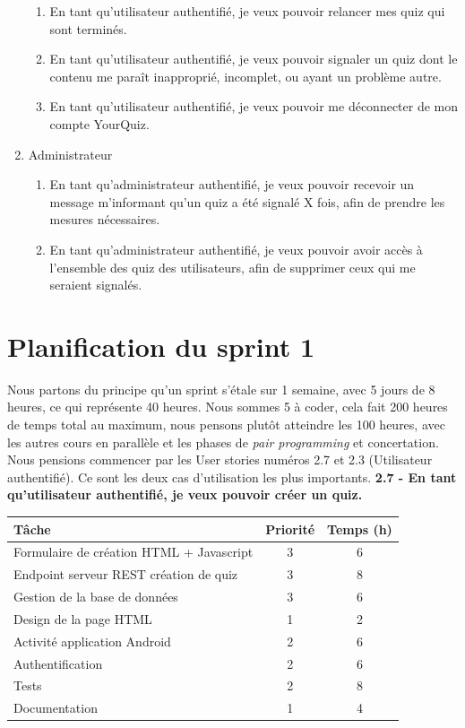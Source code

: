 \documentclass[a4paper, 12pt]{article}
\begin{document}
\begin{enumerate}
\begin{enumerate}
        \item En tant qu'utilisateur authentifié, je veux pouvoir relancer mes quiz qui sont terminés.
        \item En tant qu'utilisateur authentifié, je veux pouvoir signaler un quiz dont le contenu me paraît inapproprié, incomplet, ou ayant un problème autre.
        \item En tant qu'utilisateur authentifié, je veux pouvoir me déconnecter de mon compte YourQuiz.
    \end{enumerate}
    \item Administrateur
    \begin{enumerate}
        \item En tant qu'administrateur authentifié, je veux pouvoir recevoir un message m'informant qu'un quiz a été signalé X fois, afin de prendre les mesures nécessaires.
        \item En tant qu'administrateur authentifié, je veux pouvoir avoir accès à l'ensemble des quiz des utilisateurs, afin de supprimer ceux qui me seraient signalés.
    \end{enumerate}
\end{enumerate}


\section{Planification du sprint 1}
Nous partons du principe qu'un sprint s'étale sur 1 semaine, avec 5 jours de 8 heures, ce qui représente 
40 heures. Nous sommes 5 à coder, cela fait 200 heures de temps total au maximum, nous pensons plutôt atteindre les 100 heures, 
avec les autres cours en parallèle et les phases de \textit{pair programming} et concertation. Nous pensions commencer par les 
User stories numéros 2.7 et 2.3 (Utilisateur authentifié). Ce sont les deux cas d'utilisation les plus importants.
\bigbreak
\textbf{2.7 - En tant qu'utilisateur authentifié, je veux pouvoir créer un quiz.}
\bigbreak
\begin{tabular}{|p{.6\linewidth}|c|c|} \hline
	\textbf{Tâche} & \textbf{Priorité} & \textbf{Temps (h)} \\ \hline
	Formulaire de création HTML + Javascript & 3 & 6 \\ \hline
	Endpoint serveur REST création de quiz & 3 & 8 \\ \hline
	Gestion de la base de données & 3 & 6 \\ \hline
	Design de la page HTML & 1 & 2 \\ \hline
	Activité application Android & 2 & 6 \\ \hline
    Authentification & 2 & 6 \\ \hline
    Tests & 2 & 8 \\ \hline
    Documentation & 1 & 4 \\ \hline
\end{tabular}
\end{document}
